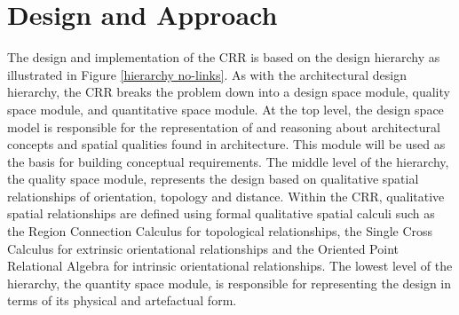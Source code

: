 \documentclass[12pt]{ucthesis}
\begin{document}

     
      



\section{Design and Approach}
The design and implementation of the CRR is based on the design hierarchy as illustrated in Figure \ref{hierarchy no-links}. As with the architectural design hierarchy, the CRR breaks the problem down into a design space module, quality space module, and quantitative space module. At the top level, the design space model is responsible for the representation of and reasoning about architectural concepts and spatial qualities found in architecture. This module will be used as the basis for building conceptual requirements. The middle level of the hierarchy, the quality space module, represents the design based on qualitative spatial relationships of orientation, topology and distance. Within the CRR, qualitative spatial relationships are defined using formal qualitative spatial calculi such as the Region Connection Calculus for topological relationships, the Single Cross Calculus for extrinsic orientational relationships and the Oriented Point Relational Algebra for intrinsic orientational relationships. The lowest level of the hierarchy, the quantity space module, is responsible for representing the design in terms of its physical and artefactual form.
\end{document}
